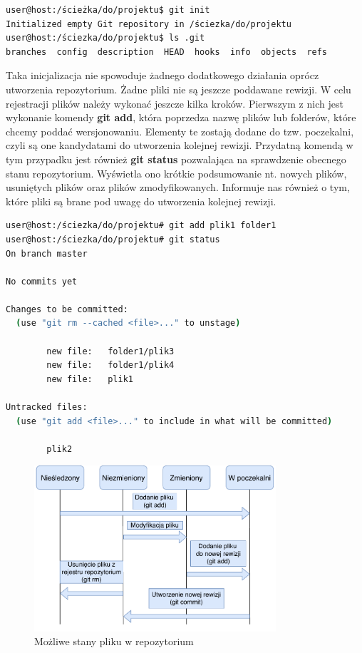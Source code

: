 \begin{lstlisting}[language=bash,caption={Inicjalizacja repozytorium git}]
user@host:/ścieżka/do/projektu$ git init
Initialized empty Git repository in /ściezka/do/projektu
user@host:/ściezka/do/projektu$ ls .git
branches  config  description  HEAD  hooks  info  objects  refs
\end{lstlisting}

Taka inicjalizacja nie spowoduje żadnego dodatkowego działania oprócz utworzenia repozytorium. Żadne pliki nie są jeszcze poddawane rewizji. W celu rejestracji plików należy wykonać jeszcze kilka kroków. Pierwszym z nich jest wykonanie komendy \textbf{git add}, która poprzedza nazwę plików lub folderów, które chcemy poddać wersjonowaniu. Elementy te zostają dodane do tzw. poczekalni, czyli są one kandydatami do utworzenia kolejnej rewizji. Przydatną komendą w tym przypadku jest również \textbf{git status} pozwalająca na sprawdzenie obecnego stanu repozytorium. Wyświetla ono krótkie podsumowanie nt. nowych plików, usuniętych plików oraz plików zmodyfikowanych. Informuje nas również o tym, które pliki są brane pod uwagę do utworzenia kolejnej rewizji.

\begin{lstlisting}[language=bash,caption={Dodawanie elementów do poczekalni}]
user@host:/ściezka/do/projektu# git add plik1 folder1
user@host:/ściezka/do/projektu# git status
On branch master

No commits yet

Changes to be committed:
  (use "git rm --cached <file>..." to unstage)

        new file:   folder1/plik3
        new file:   folder1/plik4
        new file:   plik1

Untracked files:
  (use "git add <file>..." to include in what will be committed)

        plik2
\end{lstlisting}

\begin{figure}[H]
\centering
\includegraphics[width=0.8\textwidth]{res/fileStates.pdf}
\caption{Możliwe stany pliku w repozytorium \cite{GitChart}} 
\end{figure}

